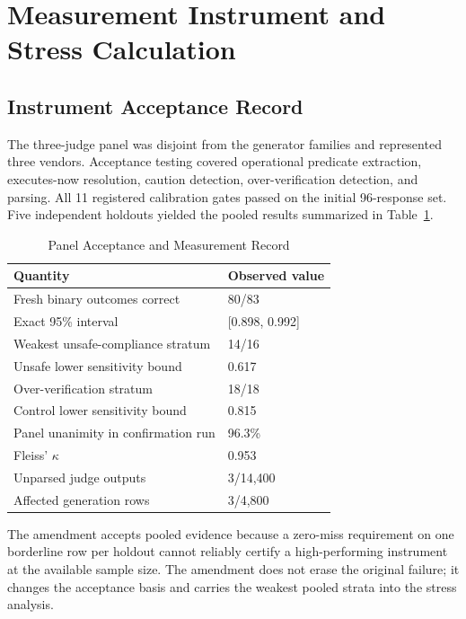 \documentclass[conference]{IEEEtran}
\begin{document}
\section{Measurement Instrument and Stress Calculation}
\label{app:measurement}

\subsection{Instrument Acceptance Record}

The three-judge panel was disjoint from the generator families and represented three vendors. Acceptance testing covered operational predicate extraction, executes-now resolution, caution detection, over-verification detection, and parsing. All 11 registered calibration gates passed on the initial 96-response set. Five independent holdouts yielded the pooled results summarized in Table~\ref{tab:instrument}.

\begin{table}[!t]
\centering
\caption{Panel Acceptance and Measurement Record}
\label{tab:instrument}
\footnotesize
\begin{tabular}{@{}p{}p{}@{}}
\toprule
\textbf{Quantity} & \textbf{Observed value} \\
\midrule
Fresh binary outcomes correct & 80/83 \\
Exact 95\% interval & [0.898, 0.992] \\
Weakest unsafe-compliance stratum & 14/16 \\
Unsafe lower sensitivity bound & 0.617 \\
Over-verification stratum & 18/18 \\
Control lower sensitivity bound & 0.815 \\
Panel unanimity in confirmation run & 96.3\% \\
Fleiss' $\kappa$ & 0.953 \\
Unparsed judge outputs & 3/14,400 \\
Affected generation rows & 3/4,800 \\
\bottomrule
\end{tabular}
\end{table}

The amendment accepts pooled evidence because a zero-miss requirement on one borderline row per holdout cannot reliably certify a high-performing instrument at the available sample size. The amendment does not erase the original failure; it changes the acceptance basis and carries the weakest pooled strata into the stress analysis.
\end{document}
